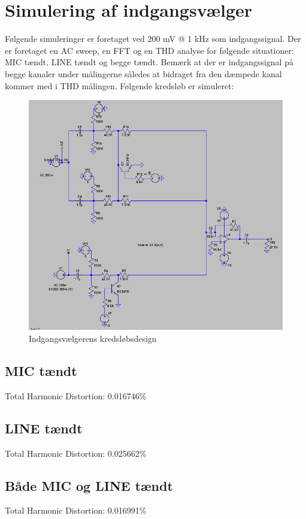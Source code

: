 







\chapter*{Simulering af indgangsvælger}

Følgende simuleringer er foretaget ved 200 mV @ 1 kHz som indgangssignal. Der er foretaget en AC sweep, en FFT og en THD analyse for følgende situationer: MIC tændt, LINE tændt og begge tændt. Bemærk at der er indgangssignal på begge kanaler under målingerne således at bidraget fra den dæmpede kanal kommer med i THD målingen. Følgende kredsløb er simuleret:

\begin{figure}[h]
\centering
\includegraphics[scale=.6]{indgangsvaelger-circuit.png}
\caption{Indgangsvælgerens kredsløbsdesign}
\label{}
\end{figure}


\section*{MIC tændt}
Total Harmonic Distortion: 0.016746\%



\section*{LINE tændt}
Total Harmonic Distortion: 0.025662\%


\section*{Både MIC og LINE tændt}
Total Harmonic Distortion: 0.016991\%






